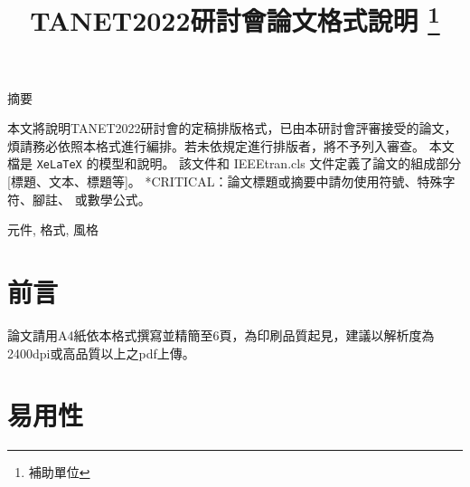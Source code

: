 \documentclass[conference]{IEEEtran}
\begin{document}
\title{TANET2022研討會論文格式說明
\thanks{補助單位}
}

\author{
\and
{}
\and
{}
\and
{}
\and
{}
\and
{}
}

\maketitle


\begin{center}
摘要
\end{center}
本文將說明TANET2022研討會的定稿排版格式，已由本研討會評審接受的論文，煩請務必依照本格式進行編排。若未依規定進行排版者，將不予列入審查。
本文檔是 {\tt XeLaTeX} 的模型和說明。
該文件和 IEEEtran.cls 文件定義了論文的組成部分 [標題、文本、標題等]。 *CRITICAL：論文標題或摘要中請勿使用符號、特殊字符、腳註、
或數學公式。

 元件, 格式, 風格



\section{前言}
論文請用A4紙依本格式撰寫並精簡至6頁，為印刷品質起見，建議以解析度為2400dpi或高品質以上之pdf上傳。

\section{易用性}
\end{document}

